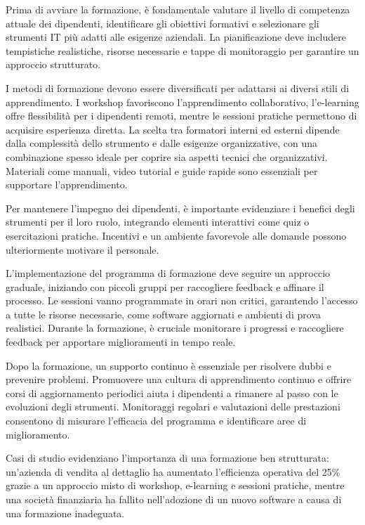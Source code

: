         Prima di avviare la formazione, è fondamentale valutare il livello di competenza attuale dei dipendenti, identificare gli obiettivi formativi e selezionare gli strumenti IT più adatti alle esigenze aziendali. La pianificazione deve includere tempistiche realistiche, risorse necessarie e tappe di monitoraggio per garantire un approccio strutturato.
        
        I metodi di formazione devono essere diversificati per adattarsi ai diversi stili di apprendimento. I workshop favoriscono l'apprendimento collaborativo, l'e-learning offre flessibilità per i dipendenti remoti, mentre le sessioni pratiche permettono di acquisire esperienza diretta. La scelta tra formatori interni ed esterni dipende dalla complessità dello strumento e dalle esigenze organizzative, con una combinazione spesso ideale per coprire sia aspetti tecnici che organizzativi. Materiali come manuali, video tutorial e guide rapide sono essenziali per supportare l'apprendimento.
        
        Per mantenere l'impegno dei dipendenti, è importante evidenziare i benefici degli strumenti per il loro ruolo, integrando elementi interattivi come quiz o esercitazioni pratiche. Incentivi e un ambiente favorevole alle domande possono ulteriormente motivare il personale.
        
        L’implementazione del programma di formazione deve seguire un approccio graduale, iniziando con piccoli gruppi per raccogliere feedback e affinare il processo. Le sessioni vanno programmate in orari non critici, garantendo l’accesso a tutte le risorse necessarie, come software aggiornati e ambienti di prova realistici. Durante la formazione, è cruciale monitorare i progressi e raccogliere feedback per apportare miglioramenti in tempo reale.
        
        Dopo la formazione, un supporto continuo è essenziale per risolvere dubbi e prevenire problemi. Promuovere una cultura di apprendimento continuo e offrire corsi di aggiornamento periodici aiuta i dipendenti a rimanere al passo con le evoluzioni degli strumenti. Monitoraggi regolari e valutazioni delle prestazioni consentono di misurare l’efficacia del programma e identificare aree di miglioramento.
        
        Casi di studio evidenziano l’importanza di una formazione ben strutturata: un’azienda di vendita al dettaglio ha aumentato l’efficienza operativa del 25\% grazie a un approccio misto di workshop, e-learning e sessioni pratiche, mentre una società finanziaria ha fallito nell’adozione di un nuovo software a causa di una formazione inadeguata.
        
